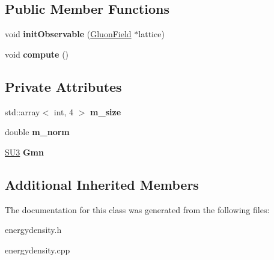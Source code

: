 \subsection*{Public Member Functions}
\begin{DoxyCompactItemize}
\item 
void {\bfseries init\+Observable} (\hyperlink{classField}{Gluon\+Field} $\ast$lattice)\hypertarget{classEnergyDensity_ad076c85838b7d1e4d795655818369409}{}\label{classEnergyDensity_ad076c85838b7d1e4d795655818369409}

\item 
void {\bfseries compute} ()\hypertarget{classEnergyDensity_a8719af212e9534be4f23244c0ea85019}{}\label{classEnergyDensity_a8719af212e9534be4f23244c0ea85019}

\end{DoxyCompactItemize}
\subsection*{Private Attributes}
\begin{DoxyCompactItemize}
\item 
std\+::array$<$ int, 4 $>$ {\bfseries m\+\_\+size}\hypertarget{classEnergyDensity_a86486c6e6f1f4a0db45e33fe17c3eb84}{}\label{classEnergyDensity_a86486c6e6f1f4a0db45e33fe17c3eb84}

\item 
double {\bfseries m\+\_\+norm}\hypertarget{classEnergyDensity_a62b537a325d00c79646876d9178ddc22}{}\label{classEnergyDensity_a62b537a325d00c79646876d9178ddc22}

\item 
\hyperlink{structSU3}{S\+U3} {\bfseries Gmn}\hypertarget{classEnergyDensity_a7beebd4229b64e2829a4bf7fa708845f}{}\label{classEnergyDensity_a7beebd4229b64e2829a4bf7fa708845f}

\end{DoxyCompactItemize}
\subsection*{Additional Inherited Members}


The documentation for this class was generated from the following files\+:\begin{DoxyCompactItemize}
\item 
energydensity.\+h\item 
energydensity.\+cpp\end{DoxyCompactItemize}
